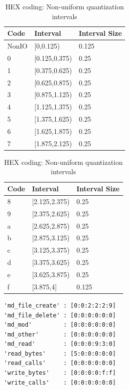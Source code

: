 \documentclass{jhps}
\begin{document}
\begin{table}

\begin{subtable}{0.49\textwidth}
\begin{tabular}{lll}
Code & Interval      & Interval Size \\
\midrule
NonIO     & [0,0.125)     & 0.125         \\
0     & [0.125,0.375) & 0.25          \\
1     & [0.375,0.625) & 0.25          \\
2     & [0.625,0.875) & 0.25          \\
3     & [0.875,1.125) & 0.25          \\
4     & [1.125,1.375) & 0.25          \\
5     & [1.375,1.625) & 0.25          \\
6     & [1.625,1.875) & 0.25          \\
7     & [1.875,2.125) & 0.25          \\
\end{tabular}
\end{subtable}
\begin{subtable}{0.49\textwidth}
\begin{tabular}{lll}
Code & Interval      & Interval Size \\
\midrule
8     & [2.125,2.375) & 0.25          \\
9    & [2.375,2.625) & 0.25          \\
a    & [2.625,2.875) & 0.25          \\
b    & [2.875,3.125) & 0.25          \\
c    & [3.125,3.375) & 0.25          \\
d    & [3.375,3.625) & 0.25          \\
e    & [3.625,3.875) & 0.25          \\
f    & [3.875,4]     & 0.125         \\
\end{tabular}
\end{subtable}

\caption{HEX coding: Non-uniform quantization intervals}
\label{tab:quant_intervals}
\end{table}


\begin{lstlisting}[caption={Hexadecimal coding of a six segments long job.}]
'md_file_create' : [0:0:2:2:2:9]
'md_file_delete' : [0:0:0:0:0:0]
'md_mod'         : [0:0:0:0:0:0]
'md_other'       : [0:0:0:0:0:0]
'md_read'        : [0:0:0:9:3:0]
'read_bytes'     : [5:0:0:0:0:0]
'read_calls'     : [0:0:0:0:0:0]
'write_bytes'    : [0:0:0:0:f:f]
'write_calls'    : [0:0:0:0:0:0]
\end{lstlisting}
\end{document}
